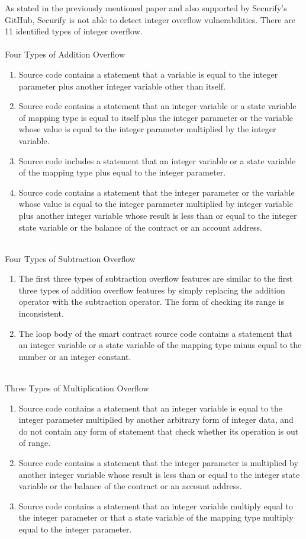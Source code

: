 \documentclass{article}
\begin{document}
As stated in the previously mentioned paper and also supported by Securify's GitHub, Securify is not able to detect integer overflow vulnerabilities. There are 11 identified types of integer overflow. \\
\\
Four Types of Addition Overflow
\begin{enumerate}
    \item Source code contains a statement that a variable is equal to the integer parameter plus another integer variable other than itself.
    \item Source code contains a statement that an integer variable or a state variable of mapping type is equal to itself plus the integer parameter or the variable whose value is equal to the integer parameter multiplied by the integer variable.
    \item Source code includes a statement that an integer variable or a state variable of the mapping type plus equal to the integer parameter.
    \item Source code contains a statement that the integer parameter or the variable whose value is equal to the integer parameter multiplied by integer variable plus another integer variable whose result is less than or equal to the integer state variable or the balance of the contract or an account address.
\end{enumerate}
\\
Four Types of Subtraction Overflow
\begin{enumerate}
    \item The first three types of subtraction overflow features are similar to the first three types of addition overflow features by simply replacing the addition operator with the subtraction operator. The form of checking its range is inconsistent.
    \item The loop body of the smart contract source code contains a statement that an integer variable or a state variable of the mapping type minus equal to the number or an integer constant.
\end{enumerate}
\\
Three Types of Multiplication Overflow
\begin{enumerate}
    \item Source code contains a statement that an integer variable is equal to the integer parameter multiplied by another arbitrary form of integer data, and do not contain any form of statement that check whether its operation is out of range.
    \item Source code contains a statement that the integer parameter is multiplied by another integer variable whose result is less than or equal to the integer state variable or the balance of the contract or an account address.
    \item Source code contains a statement that an integer variable multiply equal to the integer parameter or that a state variable of the mapping type multiply equal to the integer parameter.
\end{enumerate}
\end{document}
